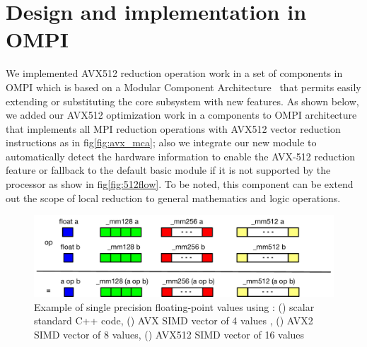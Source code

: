 \documentclass[sigconf]{acmart}
\begin{document}
\section{Design and implementation in OMPI}\label{sec:design}
We implemented AVX512 reduction operation work in a set of components in OMPI which is based on a Modular Component Architecture~\cite{dong_prrte} that permits easily extending or substituting the core subsystem with new features.
As shown below, we added our AVX512 optimization work in a components to OMPI architecture that implements all MPI reduction operations with AVX512 vector reduction instructions as in fig\ref{fig:avx_mca}; also we integrate our new module to automatically detect the hardware information to enable the AVX-512 reduction feature or fallback to the default basic module if it is not supported by the processor as show in fig\ref{fig:512flow}. To be noted, this component can be extend out the scope of local reduction to general mathematics and logic operations.

\begin{figure}[h]
    \centering
    \includegraphics[width=\linewidth]{sse_avx.pdf}
    \caption{Example of single precision floating-point values using : (\colorbox{blue}{}) scalar standard C++ code, (\colorbox{green}{}) AVX SIMD vector of 4 values , (\colorbox{red}{}) AVX2 SIMD vector of 8 values, (\colorbox{yellow}{}) AVX512 SIMD vector of 16 values}
    \label{fig:sse_avx}
\end{figure}
\end{document}
